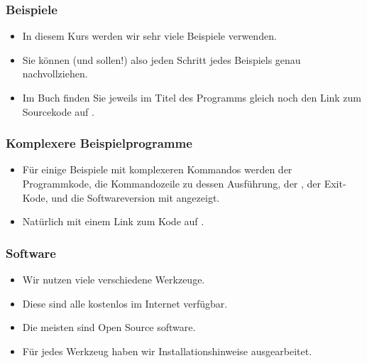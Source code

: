 \documentclass[aspectratio=169,mathserif,notheorems]{beamer}%
\begin{document}
%
\begin{frame}[fragile,t]
\frametitle{Beispiele}%
\begin{itemize}%
\item In diesem Kurs werden wir sehr viele Beispiele verwenden.
\item<2-> Sie können (und sollen!) also jeden Schritt jedes Beispiels genau nachvollziehen.%
\item<3-> Im Buch finden Sie jeweils im Titel des Programms gleich noch den Link zum Sourcekode auf \github.%
\end{itemize}%
%
%
\end{frame}
%
\begin{frame}%
\frametitle{Komplexere Beispielprogramme}%
\parbox{0.435\linewidth}{%
\begin{itemize}%
\item Für einige Beispiele mit komplexeren Kommandos werden der Programmkode, die Kommandozeile zu dessen Ausführung, der , der Exit-Kode, und die Softwareversion mit angezeigt.%
\item<2-> Natürlich mit einem Link zum Kode auf \github.%
\end{itemize}%
}%
%
\end{frame}%
%
\begin{frame}%
\frametitle{Software}%
\begin{itemize}%
\item Wir nutzen viele verschiedene Werkzeuge.%
\item<2-> Diese sind alle kostenlos im Internet verfügbar.%
\item<3-> Die meisten sind Open Source software.%
\item<4-> Für jedes Werkzeug haben wir Installationshinweise ausgearbeitet.%
\end{itemize}%
\end{frame}%
%
\end{document}
